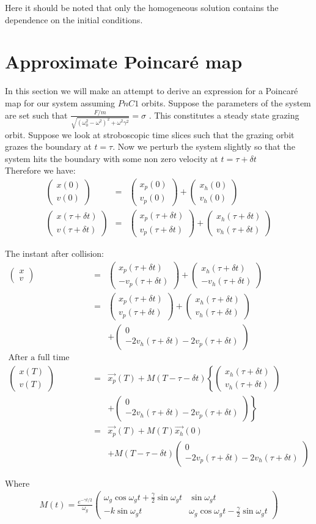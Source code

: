 \documentclass[oneside]{book}
\renewcommand{\(}{\begin{columns}}
\renewcommand{\)}{\end{columns}}
\newcommand{\<}[1]{\begin{column}{#1}}
\renewcommand{\>}{\end{column}}
\newcommand{\colv}[2]{\begin{pmatrix}#1\\#2\end{pmatrix}}
\begin{document}
Here it should be noted that only the homogeneous solution contains the 
dependence on the initial conditions.  

\section{Approximate Poincaré map}
In this section we will make an attempt to derive an expression for a Poincaré 
map for our system assuming $PnC1$ orbits.  
Suppose the parameters of the system are set such that 
$\frac{F/m}{\sqrt{(\omega_0^2-\omega^2)^2+\omega^2\gamma^2}}=\sigma$
. This constitutes a steady state grazing orbit. Suppose we look at stroboscopic time slices such that the grazing orbit grazes 
the boundary at $t=\tau$. Now we perturb the system slightly so that the system hits the boundary with 
some non zero velocity at $t=\tau+\delta t$\\

Therefore we have:
\begin{eqnarray*}
\colv{x(0)}{v(0)}&=&\colv{x_p(0)}{v_p(0)}+\colv{x_h(0)}{v_h(0)}\\
\colv{x(\tau+\delta t)}{v(\tau+\delta t)}&=&\colv{x_p(\tau+\delta t)}{v_p(\tau+\delta t)}+\colv{x_h(\tau+\delta t)}{v_h(\tau+\delta t)}
\end{eqnarray*}
 

The instant after collision:\\
\begin{eqnarray*}
\colv{x}{v}&=&\colv{x_p(\tau+\delta t)}{-v_p(\tau+\delta t)}+\colv{x_h(\tau+\delta t)}{-v_h(\tau+\delta t)}\\
&=&\colv{x_p(\tau+\delta t)}{v_p(\tau+\delta t)}+\colv{x_h(\tau+\delta t)}{v_h(\tau+\delta t)}\\
& &+\colv{0}{-2v_h(\tau+\delta t)-2v_p(\tau+\delta t)} \\
\text{After a full time period T:}&&\\
\colv{x(T)}{v(T)}
&=&\vec{x_p}(T)+M(T-\tau-\delta t)\left\{\colv{x_h(\tau+\delta t)}{v_h(\tau+\delta t)}\right.\\
& &\left.+\colv{0}{-2v_h(\tau+\delta t)-2v_p(\tau+\delta t)}\right\}\\
&=&\vec{x_p}(T)+M(T)\vec{x_h}(0)\\&&+M(T-\tau-\delta t)\colv{0}{-2v_p(\tau+\delta t)-2v_h(\tau+\delta t)}
\end{eqnarray*}

Where 
\begin{eqnarray}
\label{def-huge-M-matrix}
M(t)=\frac{e^{-\gamma t/2}}{\omega_g}
\begin{pmatrix}
\omega_g\cos{\omega_g t}+\frac{\gamma}{2}\sin{\omega_g t} & \sin{\omega_g t}\\
-k\sin{\omega_g t} & \omega_g\cos{\omega_g t}-\frac{\gamma}{2}\sin{\omega_g t}
\end{pmatrix}
\end{eqnarray}
\end{document}
